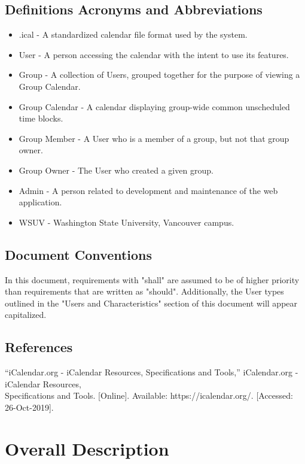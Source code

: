 \documentclass{scrreprt}
\begin{document}
\section{Definitions Acronyms and Abbreviations}
\begin{itemize}
\item .ical - A standardized calendar file format used by the system.
\item User - A person accessing the calendar with the intent to use its 
features.
\item Group - A collection of Users, grouped together for the purpose of viewing
a Group Calendar.
\item Group Calendar - A calendar displaying group-wide common unscheduled time blocks.
\item Group Member - A User who is a member of a group, but not that group owner.
\item Group Owner - The User who created a given group.
\item Admin - A person related to development and maintenance of the web application.
\item WSUV - Washington State University, Vancouver campus.
\end{itemize}

\section{Document Conventions}
In this document, requirements with "shall" are assumed to be of higher priority than
requirements that are written as "should". Additionally, the User types outlined in 
the "Users and Characteristics" section of this document will appear capitalized.


\section{References}
“iCalendar.org - iCalendar Resources, Specifications and Tools,” iCalendar.org - iCalendar Resources,\\ Specifications and Tools. [Online]. Available: https://icalendar.org/. [Accessed: 26-Oct-2019].


\chapter{Overall Description}
\end{document}
